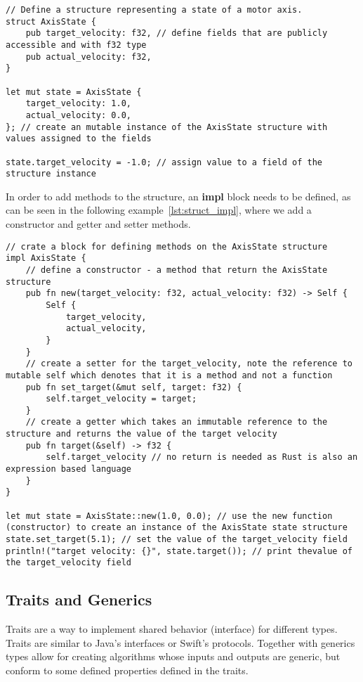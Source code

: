 \begin{lstlisting}[caption={Defining and instantiating a struct in Rust.},label=lst:struct]
// Define a structure representing a state of a motor axis.
struct AxisState {
    pub target_velocity: f32, // define fields that are publicly accessible and with f32 type
    pub actual_velocity: f32,
}

let mut state = AxisState {
    target_velocity: 1.0,
    actual_velocity: 0.0,
}; // create an mutable instance of the AxisState structure with values assigned to the fields

state.target_velocity = -1.0; // assign value to a field of the structure instance
\end{lstlisting}

In order to add methods to the structure, an \textbf{impl} block needs to be defined, as can be seen in the following example~\ref{lst:struct_impl}, where we add a constructor and getter and setter methods.
\newpage
\begin{lstlisting}[caption={Adding methods and constructor to a struct in Rust.},label=lst:struct_impl]
// crate a block for defining methods on the AxisState structure
impl AxisState {
    // define a constructor - a method that return the AxisState structure
    pub fn new(target_velocity: f32, actual_velocity: f32) -> Self {
        Self {
            target_velocity,
            actual_velocity,
        }
    }
    // create a setter for the target_velocity, note the reference to mutable self which denotes that it is a method and not a function
    pub fn set_target(&mut self, target: f32) {
        self.target_velocity = target;
    }
    // create a getter which takes an immutable reference to the structure and returns the value of the target velocity
    pub fn target(&self) -> f32 {
        self.target_velocity // no return is needed as Rust is also an expression based language
    }
}

let mut state = AxisState::new(1.0, 0.0); // use the new function (constructor) to create an instance of the AxisState state structure
state.set_target(5.1); // set the value of the target_velocity field
println!("target velocity: {}", state.target()); // print thevalue of the target_velocity field
\end{lstlisting}

\subsection{Traits and Generics}
\label{subsec:traits}
Traits are a way to implement shared behavior (interface) for different types.
Traits are similar to Java's interfaces or Swift's protocols.
Together with generics types allow for creating algorithms whose inputs and outputs are generic, but conform to some defined properties defined in the traits.

